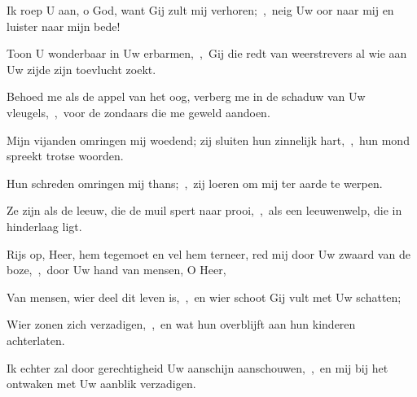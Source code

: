 \documentclass[12pt,twoside,a5paper]{article}
\begin{document}

\begin{halfparskip}
  Ik roep U aan, o God, want Gij zult mij verhoren;~\sep\ neig Uw oor naar mij en luister naar mijn bede!

  Toon U wonderbaar in Uw erbarmen,~\sep\ Gij die redt van weerstrevers al wie aan Uw zijde zijn toevlucht zoekt.

  Behoed me als de appel van het oog, verberg me in de schaduw van Uw vleugels,~\sep\ voor de zondaars die me geweld aandoen.

  Mijn vijanden omringen mij woedend; zij sluiten hun zinnelijk hart,~\sep\ hun mond spreekt trotse woorden.

  Hun schreden omringen mij thans;~\sep\ zij loeren om mij ter aarde te werpen.

  Ze zijn als de leeuw, die de muil spert naar prooi,~\sep\ als een leeuwenwelp, die in hinderlaag ligt.
\end{halfparskip}


\begin{halfparskip}
  Rijs op, Heer, hem tegemoet en vel hem terneer, red mij door Uw zwaard van de boze,~\sep\ door Uw hand van mensen, O Heer,

  Van mensen, wier deel dit leven is,~\sep\ en wier schoot Gij vult met Uw schatten;

  Wier zonen zich verzadigen,~\sep\ en wat hun overblijft aan hun kinderen achterlaten.

  Ik echter zal door gerechtigheid Uw aanschijn aanschouwen,~\sep\ en mij bij het ontwaken met Uw aanblik verzadigen.
\end{halfparskip}




\end{document}
